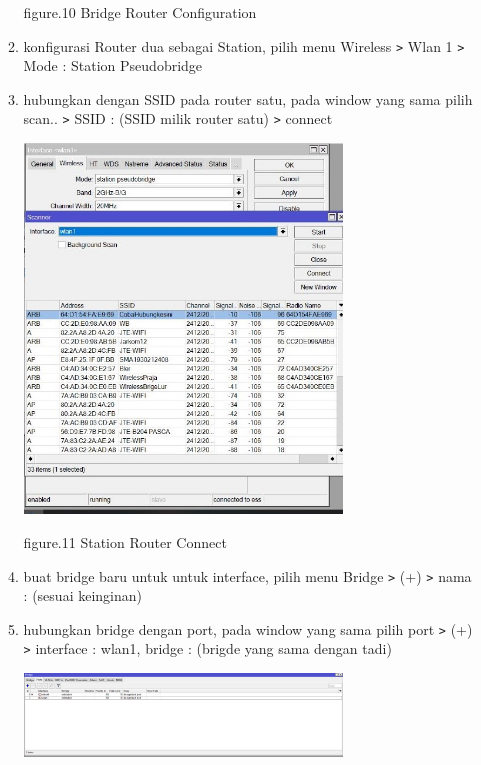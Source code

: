 \begin{enumerate}
\begin{enumerate}
\begin{center}
            figure.10 Bridge Router Configuration
        \end{center}

        \item konfigurasi Router dua sebagai Station, pilih menu Wireless \texttt{\text>} Wlan 1 \texttt{\text>} Mode : Station Pseudobridge
        \item hubungkan dengan SSID pada router satu, pada window yang sama pilih scan.. \texttt{\text>} SSID : (SSID milik router satu) \texttt{\text>} connect

        \begin{center}
            \includegraphics[width=0.7\textwidth]{image/P1/Wireless/1-Pseudobridgeconf.jpg}    
            
            figure.11 Station Router Connect
        \end{center}

        \item buat bridge baru untuk untuk interface, pilih menu Bridge \texttt{\text>} (+) \texttt{\text>} nama : (sesuai keinginan)
        \item hubungkan bridge dengan port, pada window yang sama pilih port \texttt{\text>} (+) \texttt{\text>} interface : wlan1, bridge : (brigde yang sama dengan tadi)
        
        \begin{center}
            \includegraphics[width=0.7\textwidth]{image/P1/Wireless/4-Bridgelist.png}    
            

\end{center}
\end{enumerate}
\end{enumerate}
